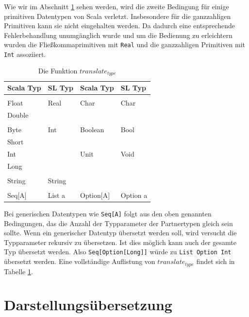\documentclass[12pt]{scrreprt}
\begin{document}
Wie wir im Abschnitt \ref{sec:value-transformation} sehen werden, wird die zweite Bedingung für einige primitiven Datentypen von Scala verletzt. Insbesondere für die ganzzahligen Primitiven kann sie nicht eingehalten werden. Da dadurch eine entsprechende Fehlerbehandlung unumgänglich wurde und um die Bedienung zu erleichtern wurden die Fließkommaprimitiven mit \lstinline!Real! und die ganzzahligen Primitiven mit \lstinline!Int! assoziiert.


\begin{table}[h]
\caption{Die Funktion $translate_{type}$}
\centering
\begin{tabular}{ll|ll}
Scala Typ & \ac{SL} Typ & Scala Typ & \ac{SL} Typ \\
\hline
\\
Float     & Real        & Char      & Char \\
Double    & \\
          &             &           & \\
Byte      & Int         & Boolean   & Bool \\
Short     & \\
Int       &             & Unit      &  Void \\
Long      & \\
          &             &           & \\
String    & String \\
          &             &           & \\
Seq[A]    & List a      & Option[A] & Option a

\end{tabular}
\label{tab:translate_type}
\end{table}

Bei generischen Datentypen wie \lstinline!Seq[A]! folgt aus den oben genannten Bedingungen, das die Anzahl der Typparameter der Partnertypen gleich sein sollte. Wenn ein generischer Datentyp übersetzt werden soll, wird versucht die Typparameter rekursiv zu übersetzen. Ist dies möglich kann auch der gesamte Typ übersetzt werden. Also \lstinline!Seq[Option[Long]]! würde zu \lstinline!List Option Int! übersetzt werden. Eine vollständige Auflistung von $translate_{type}$ findet sich in Tabelle \ref{tab:translate_type}.

\section{Darstellungsübersetzung}
\label{sec:value-transformation}
\end{document}

